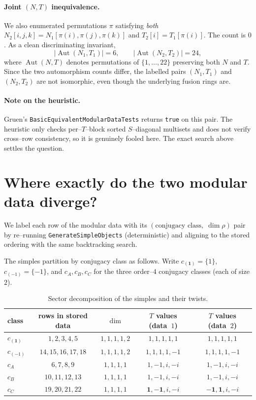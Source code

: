 \documentclass[11pt,a4paper]{amsart}
\theoremstyle{plain}
\theoremstyle{definition}
\DeclareMathOperator{\Aut}{Aut}
\newcommand{\trivcoc}{\mathbf{1}}
\begin{document}
\paragraph*{Joint $(N,T)$ inequivalence.}
We also enumerated permutations $\pi$ satisfying \emph{both}
$N_2[i,j,k]=N_1[\pi(i),\pi(j),\pi(k)]$ and $T_2[i]=T_1[\pi(i)]$. The
count is $0$. As a clean discriminating invariant,
\[
  |\Aut(N_1, T_1)| = 6,\qquad |\Aut(N_2, T_2)| = 24,
\]
where $\Aut(N,T)$ denotes permutations of $\{1,\dots,22\}$ preserving
both $N$ and $T$. Since the two automorphism counts differ, the labelled
pairs $(N_1,T_1)$ and $(N_2,T_2)$ are not isomorphic, even though the
underlying fusion rings are.

\paragraph*{Note on the heuristic.}
Gruen's \texttt{BasicEquivalentModularDataTests} returns \texttt{true}
on this pair. The heuristic only checks per--$T$--block sorted
$S$--diagonal multisets and does not verify cross--row consistency, so
it is genuinely fooled here. The exact search above settles the
question.

\section{Where exactly do the two modular data diverge?}

We label each row of the modular data with its
$(\text{conjugacy class},\;\dim\rho)$ pair by re--running
\texttt{GenerateSimpleObjects} (deterministic) and aligning to the
stored ordering with the same backtracking search.

The simples partition by conjugacy class as follows. Write
$c_{(\trivcoc)}=\{1\}$, $c_{(-1)}=\{-1\}$, and $c_A,c_B,c_C$ for the
three order--$4$ conjugacy classes (each of size $2$).

\begin{table}[h!]
\centering
\renewcommand{\arraystretch}{1.2}
\begin{tabular}{l c c c c}
\toprule
class & rows in stored data & $\dim$ & $T$ values (data~$1$) & $T$ values (data~$2$) \\
\midrule
$c_{(\trivcoc)}$ & $1,2,3,4,5$    & $1,1,1,1,2$ & $1,1,1,1,1$       & $1,1,1,1,1$ \\
$c_{(-1)}$       & $14,15,16,17,18$ & $1,1,1,1,2$ & $1,1,1,1,-1$       & $1,1,1,1,-1$ \\
$c_A$            & $6,7,8,9$      & $1,1,1,1$   & $1,-1,i,-i$       & $1,-1,i,-i$ \\
$c_B$            & $10,11,12,13$  & $1,1,1,1$   & $1,-1,i,-i$       & $1,-1,i,-i$ \\
$c_C$            & $19,20,21,22$  & $1,1,1,1$   & $\boldsymbol{1,-1},i,-i$ & $\boldsymbol{-1,1},i,-i$ \\
\bottomrule
\end{tabular}
\caption{Sector decomposition of the simples and their twists.}
\label{tab:sectors}
\end{table}
\end{document}
